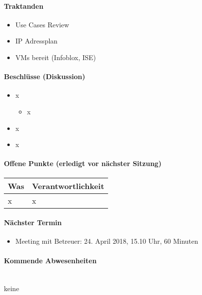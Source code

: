 \paragraph{Traktanden}
\begin{itemize}	
	\item Use Cases Review
	\item IP Adressplan
	\item VMs bereit (Infoblox, ISE)
\end{itemize}

\paragraph{Beschlüsse (Diskussion)}
\begin{itemize}	
	\item x
	\begin{itemize}
		\item x
	\end{itemize}
	\item x
	\item x
\end{itemize}

\paragraph{Offene Punkte (erledigt vor nächster Sitzung)} \mbox{}

\begin{table}[H]
	\centering
	\begin{tabularx}{\textwidth}{X | p{4.5cm}}
		\rowcolor{gray!50}
		\textbf{Was} & \textbf{Verantwortlichkeit} \\
		\hline
		x & x \\	
	\end{tabularx}
	\label{tab:my-label}
\end{table}

\paragraph{Nächster Termin}
\begin{itemize}	
	\item Meeting mit Betreuer: 24. April 2018, 15.10 Uhr, 60 Minuten
\end{itemize}

\paragraph{Kommende Abwesenheiten} \mbox{}\\
keine






